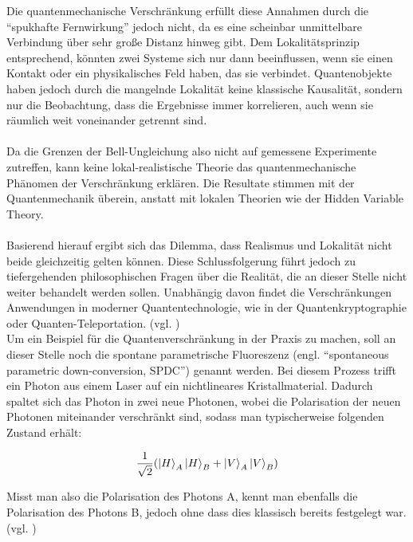Die quantenmechanische Verschränkung erfüllt diese Annahmen durch die ``spukhafte Fernwirkung'' jedoch nicht, da es eine scheinbar unmittelbare Verbindung über sehr große Distanz hinweg gibt. Dem Lokalitätsprinzip entsprechend, könnten zwei Systeme sich nur dann beeinflussen, wenn sie einen Kontakt oder ein physikalisches Feld haben, das sie verbindet. Quantenobjekte haben jedoch durch die mangelnde Lokalität keine klassische Kausalität, sondern nur die Beobachtung, dass die Ergebnisse immer korrelieren, auch wenn sie räumlich weit voneinander getrennt sind.
\\ \\
Da die Grenzen der Bell-Ungleichung also nicht auf gemessene Experimente zutreffen, kann keine lokal-realistische Theorie das quantenmechanische Phänomen der Verschränkung erklären. Die Resultate stimmen mit der Quantenmechanik überein, anstatt mit lokalen Theorien wie der Hidden Variable Theory. 
\\ \\
Basierend hierauf ergibt sich das Dilemma, dass Realismus und Lokalität nicht beide gleichzeitig gelten können. Diese Schlussfolgerung führt jedoch zu tiefergehenden philosophischen Fragen über die Realität, die an dieser Stelle nicht weiter behandelt werden sollen. Unabhängig davon findet die Verschränkungen Anwendungen in moderner Quantentechnologie, wie in der Quantenkryptographie oder Quanten-Teleportation.  
(vgl. \cite[Ch. 2.11]{homeister_quantum_2022-1})
\\

Um ein Beispiel für die Quantenverschränkung in der Praxis zu machen, soll an dieser Stelle noch  die spontane parametrische Fluoreszenz (engl. ``spontaneous parametric down-conversion, SPDC'') genannt werden. Bei diesem Prozess trifft ein Photon aus einem Laser auf ein nichtlineares Kristallmaterial. Dadurch spaltet sich das Photon in zwei neue Photonen, wobei die Polarisation der neuen Photonen miteinander verschränkt sind, sodass man typischerweise folgenden Zustand erhält:

\[
\frac{1}{\sqrt{2}}  ( \ket{H}_A \ket{H}_B + \ket{V}_A \ket{V}_B )
\]

Misst man also die Polarisation des Photons A, kennt man ebenfalls die Polarisation des Photons B, jedoch ohne dass dies klassisch bereits festgelegt war.
(vgl. \cite[Ch. 7]{hughes_quantum_2021})



